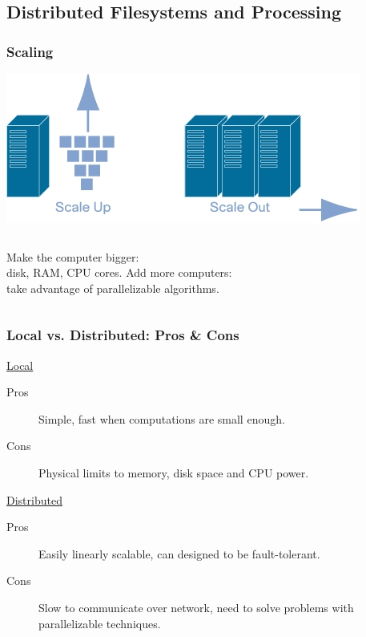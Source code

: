 \documentclass{beamer}
\begin{document}
\subsection{Distributed Filesystems and Processing}
\begin{frame}
  \frametitle{Scaling}
  \hspace{2mm}\includegraphics[width=\textwidth]{../images/scaling.jpg}
  \vspace{2mm}
  \begin{columns}
    Make the computer bigger:\\ disk, RAM, CPU cores.
    Add more computers:\\take advantage of parallelizable algorithms.
  \end{columns}
\end{frame}

\begin{frame}
  \frametitle{Local vs. Distributed: Pros \& Cons}
    {\LARGE \underline{Local}}
    \vspace{1mm}
    \begin{description}
      \item[Pros] Simple, fast when computations are small enough.
      \item[Cons] Physical limits to memory, disk space and CPU power.
    \end{description}
    \vspace{4mm}
    {\LARGE \underline{Distributed}}
    \vspace{1mm}
    \begin{description}
      \item[Pros] Easily linearly scalable, can designed to be fault-tolerant.
      \item[Cons] Slow to communicate over network, need to solve problems with parallelizable techniques.
    \end{description}
\end{frame}
\end{document}
